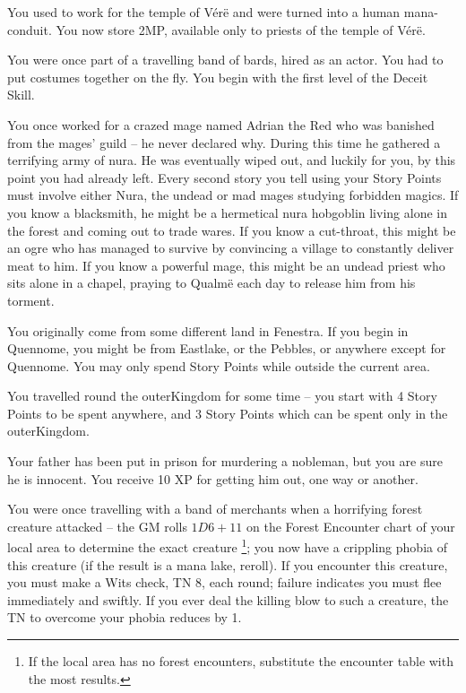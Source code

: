 \begin{multicols}{2}
\begin{list}{\addtocounter{list}{1}\textbf{:}}{\raggedleft}
	\item
	You used to work for the temple of V\'{e}r\"{e} and were turned into a human mana-conduit.
	You now store 2MP, available only to priests of the temple of V\'{e}r\"{e}.

	\item
	You were once part of a travelling band of bards, hired as an actor.
	You had to put costumes together on the fly.
	You begin with the first level of the Deceit Skill.

	\item
	You once worked for a crazed mage named Adrian the Red who was banished from the mages' guild -- he never declared why.
	During this time he gathered a terrifying army of nura.
	He was eventually wiped out, and luckily for you, by this point you had already left.
	Every second story you tell using your Story Points must involve either Nura, the undead or mad mages studying forbidden magics.
	If you know a blacksmith, he might be a hermetical nura hobgoblin living alone in the forest and coming out to trade wares.
	If you know a cut-throat, this might be an ogre who has managed to survive by convincing a village to constantly deliver meat to him.
	If you know a powerful mage, this might be an undead priest who sits alone in a chapel, praying to Qualm\"{e} each day to release him from his torment.

	\item
	You originally come from some different land in Fenestra.
	If you begin in Quennome, you might be from Eastlake, or the Pebbles, or anywhere except for Quennome.
	You may only spend Story Points while outside the current area.

	\item
	You travelled round the \gls{outerKingdom} for some time -- you start with 4 Story Points to be spent anywhere, and 3 Story Points which can be spent only in the \gls{outerKingdom}.

	\item
	Your father has been put in prison for murdering a nobleman, but you are sure he is innocent.
	You receive 10 XP for getting him out, one way or another.

	\item
	You were once travelling with a band of merchants when a horrifying forest creature attacked -- the GM rolls $1D6+11$ on the Forest Encounter chart of your local area to determine the exact creature%
	\footnote{If the local area has no forest encounters, substitute the encounter table with the most results.};
	you now have a crippling phobia of this creature (if the result is a mana lake, reroll).
	If you encounter this creature, you must make a Wits check, TN 8, each round; failure indicates you must flee immediately and swiftly.
	If you ever deal the killing blow to such a creature, the TN to overcome your phobia reduces by 1.


\end{list}
\end{multicols}
